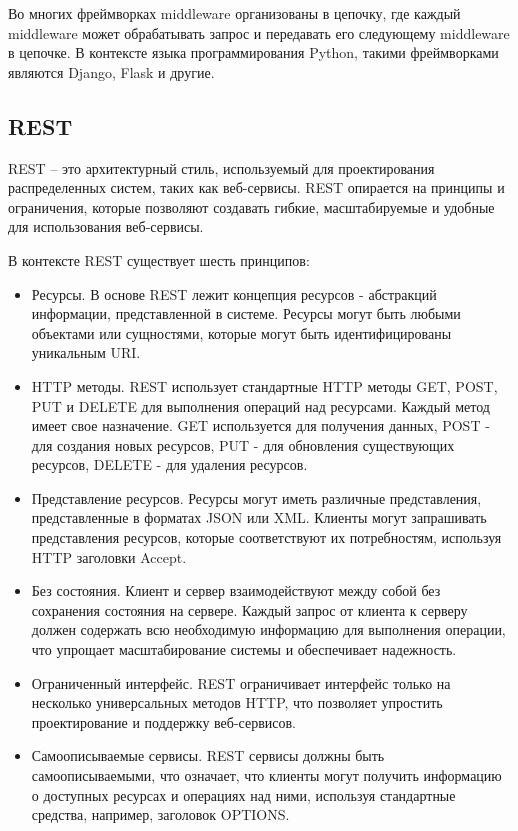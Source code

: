 Во многих фреймворках middleware организованы в цепочку, где каждый middleware может обрабатывать запрос и передавать его следующему middleware в цепочке.
В контексте языка программирования Python, такими фреймворками являются Django, Flask и другие.


\subsection{REST}\label{subsec:domain:rest}
REST -- это архитектурный стиль, используемый для проектирования распределенных систем, таких как веб-сервисы.
REST опирается на принципы и ограничения, которые позволяют создавать гибкие, масштабируемые и удобные для использования веб-сервисы.

В контексте REST существует шесть принципов:
\begin{itemize}
    \item Ресурсы.
    В основе REST лежит концепция ресурсов - абстракций информации, представленной в системе.
    Ресурсы могут быть любыми объектами или сущностями, которые могут быть идентифицированы уникальным URI.
    \item HTTP методы.
    REST использует стандартные HTTP методы GET, POST, PUT и DELETE для выполнения операций над ресурсами.
    Каждый метод имеет свое назначение.
    GET используется для получения данных,
    POST - для создания новых ресурсов,
    PUT - для обновления существующих ресурсов,
    DELETE - для удаления ресурсов.
    \item Представление ресурсов.
    Ресурсы могут иметь различные представления, представленные в форматах JSON или XML.
    Клиенты могут запрашивать представления ресурсов, которые соответствуют их потребностям, используя HTTP заголовки Accept.
    \item Без состояния.
    Клиент и сервер взаимодействуют между собой без сохранения состояния на сервере.
    Каждый запрос от клиента к серверу должен содержать всю необходимую информацию для выполнения операции, что упрощает масштабирование системы и обеспечивает надежность.
    \item Ограниченный интерфейс.
    REST ограничивает интерфейс только на несколько универсальных методов HTTP, что позволяет упростить проектирование и поддержку веб-сервисов.
    \item Самоописываемые сервисы.
    REST сервисы должны быть самоописываемыми, что означает, что клиенты могут получить информацию о доступных ресурсах и операциях над ними, используя стандартные средства, например, заголовок OPTIONS.
\end{itemize}

